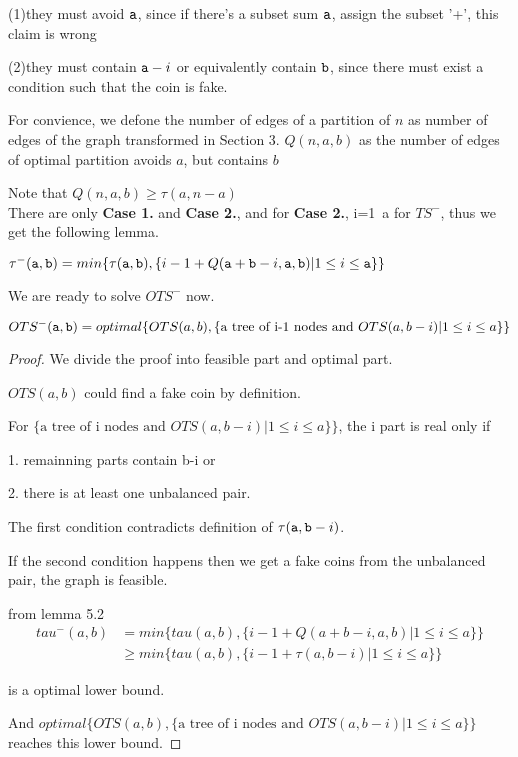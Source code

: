 (1)they must avoid $\mathtt{a}$, since if there's a subset sum $\mathtt{a}$, assign the subset '+', this claim is wrong

(2)they must contain $\mathtt{a}-i$ or equivalently contain $\mathtt{b}$, since there must exist a condition such that the coin is fake.


\begin{definition}
For convience, we defone the number of edges of a partition of $n$ as number of edges of the graph transformed in Section 3.
$Q(n,a,b)$ as the number of edges of optimal partition avoids $a$, but contains $b$ 
\end{definition}

Note that $Q(n,a,b)\geq\tau(a,n-a)$\\

There are only \textbf{Case 1.} and \textbf{Case 2.}, 
and for \textbf{Case 2.}, i=1~a for $TS^-$, thus we get the following lemma.

\begin{lemma}
$\tau^-(\mathtt{a},\mathtt{b})=min\{\tau(\mathtt{a},\mathtt{b}), \{i-1+Q(\mathtt{a}+\mathtt{b}-i,\mathtt{a},\mathtt{b}) | 1\leq i\leq\mathtt{a}\} \}$
\end{lemma}

We are ready to solve $OTS^-$ now.

\begin{theorem}
$OTS^-(\mathtt{a},\mathtt{b})=optimal\{OTS(a,b), \{\text{a tree of i-1 nodes and }OTS(a,b-i) |1\leq i\leq a\}\}$
\end{theorem}

\begin{proof}
We divide the proof into feasible part and optimal part.


$OTS(a,b)$ could find a fake coin by definition.

For $\{\text{a tree of i nodes and }OTS(a,b-i) |1\leq i\leq a\}\}$, the i part is real only if 

1. remainning parts contain b-i or 

2. there is at least one unbalanced pair. 

The first condition contradicts definition of $\tau(\mathtt{a},\mathtt{b}-i)$.

If the second condition happens then we get a fake coins from the unbalanced pair, the graph is feasible.

from lemma 5.2
\begin{align*}
tau^-(a,b)&=min\{tau(a,b),\{i-1+Q(a+b-i,a,b) | 1\leq i\leq a\} \}\\
&\geq min\{tau(a,b), \{i-1+\tau(a,b-i) | 1\leq i\leq a\} \}
\end{align*}

is a optimal lower bound.

And $optimal\{OTS(a,b), \{\text{a tree of i nodes and }OTS(a,b-i) |1\leq i\leq a\}\}$ reaches this lower bound.

\end{proof}

